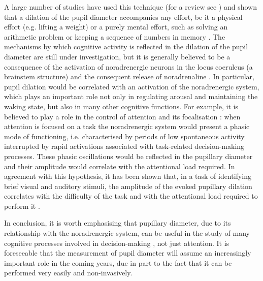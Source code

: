 \documentclass[11pt]{article}
\begin{document}
A large number of studies have used this technique (for a review see \cite{Beatty2000}) and shown that a dilation of the pupil diameter accompanies any effort, be it a physical effort (e.g. lifting a weight) or a purely mental effort, such as solving an arithmetic problem \cite{Hess1964} or keeping a sequence of numbers in memory \cite{Kahneman1966}. The mechanisms by which cognitive activity is reflected in the dilation of the pupil diameter are still under investigation, but it is generally believed to be a consequence of the activation of noradrenergic neurons in the locus coeruleus (a brainstem structure) and the consequent release of noradrenaline \cite{Aston-Jones2005}. In particular, pupil dilation would be correlated with an activation of the noradrenergic system, which plays an important role not only in regulating arousal and maintaining the waking state, but also in many other cognitive functions. For example, it is believed to play a role in the control of attention and its focalisation \cite{Corbetta2008}: when attention is focused on a task the noradrenergic system would present a phasic mode of functioning, i.e. characterised by periods of low spontaneous activity interrupted by rapid activations associated with task-related decision-making processes. These phasic oscillations would be reflected in the pupillary diameter and their amplitude would correlate with the attentional load required. In agreement with this hypothesis, it has been shown that, in a task of identifying brief visual and auditory stimuli, the amplitude of the evoked pupillary dilation correlates with the difficulty of the task and with the attentional load required to perform it \cite{Lisi2015b}.

In conclusion, it is worth emphasising that pupillary diameter, due to its relationship with the noradrenergic system, can be useful in the study of many cognitive processes involved in decision-making \cite{Nieuwenhuis2005}, not just attention. It is foreseeable that the measurement of pupil diameter will assume an increasingly important role in the coming years, due in part to the fact that it can be performed very easily and non-invasively.
\end{document}

